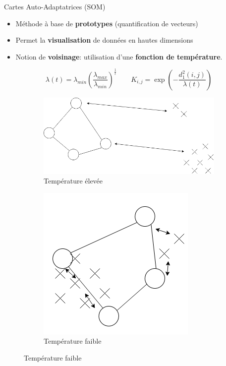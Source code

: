 \documentclass[hyperref={pdfpagelabels=false}]{beamer}
\begin{document}
        \begin{frame}{Cartes Auto-Adaptatrices (SOM)}
            \begin{itemize}
                \item Méthode à base de \textbf{prototypes} (quantification de 
                    vecteurs)
                \item Permet la \textbf{visualisation} de données en hautes 
                    dimensions
                \item Notion de \textbf{voisinage}: utilisation d'une 
                    \textbf{fonction de température}.
            \end{itemize}

            \begin{equation*}
                \lambda(t) = 
                \lambda_{min}\left(\frac{\lambda_{max}}{\lambda_{min}}\right)^{\frac{1}{t}}
                \qquad
                K_{i,j} = \exp\left(-\frac{d^2_1(i,j)}{\lambda(t)}\right)
            \end{equation*}

            \begin{figure}[b]
                \centering
                \begin{subfigure}[b]{0.45\textwidth}
                    \centering
                    \includegraphics[scale=.2]{somhot}
                    \caption{Température élevée}
                \end{subfigure}
                \begin{subfigure}[b]{0.45\textwidth}
                    \centering
                    \includegraphics[scale=.25]{somcold}
                    \caption{Température faible}
                \end{subfigure}
            \end{figure}
        \end{frame}
\end{document}
